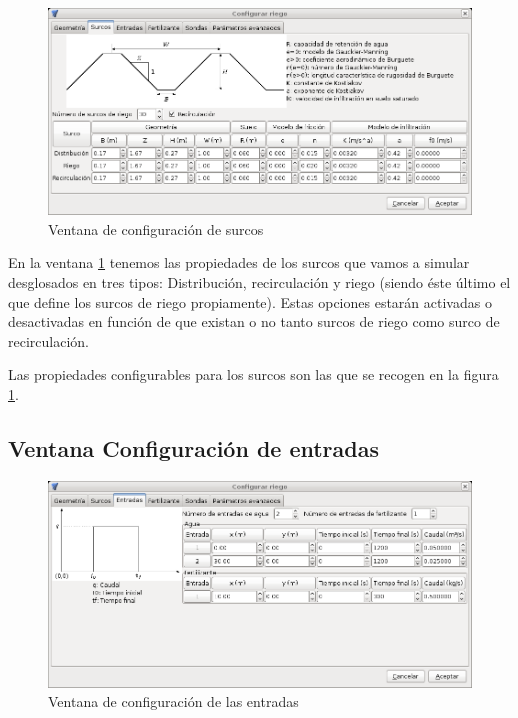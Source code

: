 \begin{figure}[!h]
\begin{center}
\includegraphics*[width=\textwidth]{images/confSurco.png}
\qquad
\caption{Ventana de configuración de surcos}\label{confSurcos}
\end{center}
\end{figure}

En la ventana \ref{confSurcos} tenemos las propiedades de los surcos que vamos a simular desglosados en tres tipos: Distribución, recirculación y riego (siendo éste último el que define los surcos de riego propiamente). Estas opciones estarán activadas o desactivadas en función de que existan o no tanto surcos de riego como  surco de recirculación.

Las propiedades configurables para los surcos son las que se recogen en la figura \ref{confSurcos}.

\subsection{Ventana Configuración de entradas}

\begin{figure}[!h]
\begin{center}
\includegraphics*[width=\textwidth]{images/confInput.png}
\qquad
\caption{Ventana de configuración de las entradas}\label{input}
\end{center}
\end{figure}

